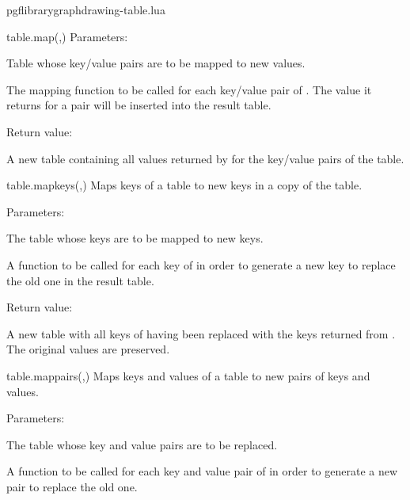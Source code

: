 \begin{filedescription}{pgflibrarygraphdrawing-table.lua}
\begin{luacommand}{{table.map}(,)}
Parameters:
\begin{parameterdescription}
	\item[\meta{input}] Table whose key/value pairs are to be mapped to new values.\item[\meta{map\_func}] The mapping function to be called for each key/value pair of . The value it returns for a pair will be inserted into the result table. 
\end{parameterdescription}


Return value:
\begin{parameterdescription} 
  \item[] A new table containing all values returned by  for the key/value pairs of the  table. 
\end{parameterdescription}


\end{luacommand}
\begin{luacommand}{{table.map\textunderscore{}keys}(,)}
Maps keys of a table to new keys in a copy of the table. 

Parameters:
\begin{parameterdescription}
	\item[\meta{table}] The table whose keys are to be mapped to new keys.\item[\meta{map\_func}] A function to be called for each key of  in order to generate a new key to replace the old one in the result table. 
\end{parameterdescription}


Return value:
\begin{parameterdescription} 
  \item[] A new table with all keys of  having been replaced with the keys returned from . The original values are preserved. 
\end{parameterdescription}


\end{luacommand}
\begin{luacommand}{{table.map\textunderscore{}pairs}(,)}
Maps keys and values of a table to new pairs of keys and values. 

Parameters:
\begin{parameterdescription}
	\item[\meta{table}] The table whose key and value pairs are to be replaced.\item[\meta{map\_func}] A function to be called for each key and value pair of  in order to generate a new pair to replace the old one. 
\end{parameterdescription}



\end{luacommand}
\end{filedescription}
